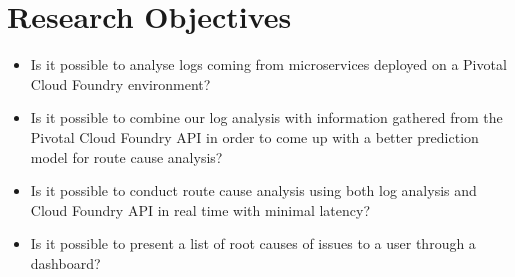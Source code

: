 \chapter{Research Objectives}

\begin{itemize}
  \item Is it possible to analyse logs coming from microservices deployed on a Pivotal Cloud Foundry environment?
  \item Is it possible to combine our log analysis with information gathered from the Pivotal Cloud Foundry API in order to come up with a better prediction model for route cause analysis?
  \item Is it possible to conduct route cause analysis using both log analysis and Cloud Foundry API in real time with minimal latency?
  \item Is it possible to present a list of root causes of issues to a user through a dashboard?
\end{itemize}